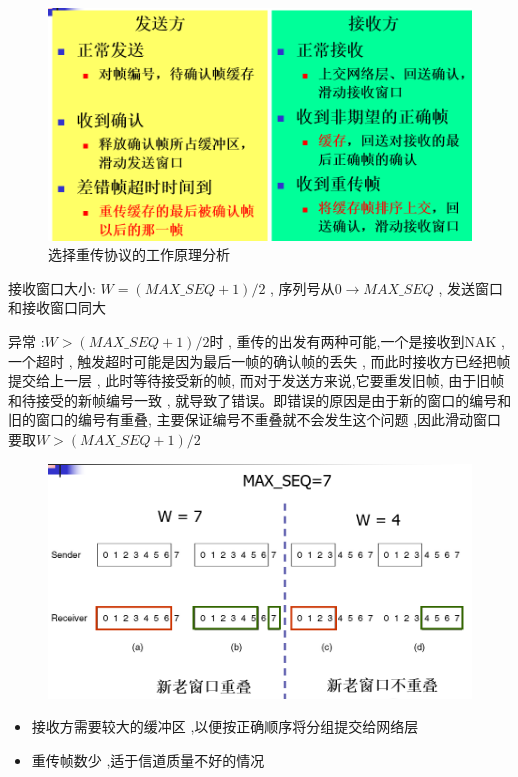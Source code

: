 \documentclass[UTF8,a4paper]{ctexart}
\begin{document}
\begin{figure}[H]
  \centering
  \includegraphics[scale = 0.3]{assets/jisuanjiwangluo_a74df.png}
  \caption{选择重传协议的工作原理分析}
\end{figure}

接收窗口大小:  $W = (MAX\_SEQ + 1) / 2$ , 序列号从$0\to MAX\_SEQ$ , 发送窗口和接收窗口同大

异常 :$W >  (MAX\_SEQ + 1) / 2$时 , 重传的出发有两种可能,一个是接收到NAK , 一个超时 , 触发超时可能是因为最后一帧的确认帧的丢失 , 而此时接收方已经把帧提交给上一层 ,
此时等待接受新的帧, 而对于发送方来说,它要重发旧帧, 由于旧帧和待接受的新帧编号一致 , 就导致了错误。即错误的原因是由于新的窗口的编号和旧的窗口的编号有重叠, 主要保证编号不重叠就不会发生这个问题 ,因此滑动窗口要取$W >  (MAX\_SEQ + 1) / 2$

\begin{figure}[H]
  \centering
  \includegraphics[scale = 0.3]{assets/jisuanjiwangluo_e889b.png}
\end{figure}

\begin{itemize}
  \item 接收方需要较大的缓冲区 ,以便按正确顺序将分组提交给网络层
  \item 重传帧数少 ,适于信道质量不好的情况
\end{itemize}
\end{document}
